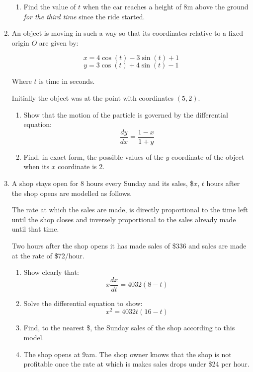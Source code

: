 \documentclass[../main.tex]{subfiles}
\begin{document}
\begin{enumerate}[itemsep=0.7cm]
\begin{enumerate}[itemsep=0.5cm]
        \item
        Find the value of $t$ when the car reaches a height of 8m above the ground \textit{for the third time} since the ride started.
    \end{enumerate}

    \item
    An object is moving in such a way so that its coordinates relative to a fixed origin $O$ are given by:

    \[x=4\cos{(t)}-3\sin{(t)}+1\]
    \[y=3\cos{(t)}+4\sin{(t)}-1\]

    Where $t$ is time in seconds.

    Initially the object was at the point with coordinates $(5,2)$.

    \begin{enumerate}[itemsep=0.5cm]
        \item
        Show that the motion of the particle is governed by the differential equation:
        \[\frac{dy}{dx}=\frac{1-x}{1+y}\]

        \item 
        Find, in exact form, the possible values of the $y$ coordinate of the object when its $x$ coordinate is 2.
    \end{enumerate}

    \item 
    A shop stays open for 8 hours every Sunday and its sales, \$$x$, $t$ hours after the shop opens are modelled as follows.

    The rate at which the sales are made, is directly proportional to the time left until the shop closes and inversely proportional to the sales already made until that time.

    Two hours after the shop opens it has made sales of \$336 and sales are made at the rate of \$72/hour.

    \begin{enumerate}[itemsep=0.5cm]
        \item 
        Show clearly that:
        \[x\frac{dx}{dt}=4032(8-t)\]

        \item 
        Solve the differential equation to show:
        \[x^2=4032t(16-t)\]

        \item 
        Find, to the nearest \$, the Sunday sales of the shop according to this model.

        \item
        The shop opens at 9am. The shop owner knows that the shop is not profitable once the rate at which is makes sales drops under \$24 per hour.


\end{enumerate}
\end{enumerate}
\end{document}
